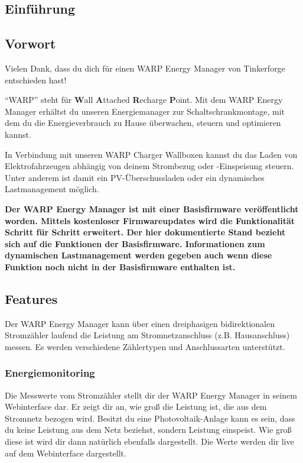 \documentclass[a4paper,10pt]{article}
\begin{document}
\begin{multicols*}{2}
	\tableofcontents
	\newpage
	\section{Einführung}
	\subsection{Vorwort} Vielen Dank, dass du
	dich für einen WARP Energy Manager von Tinkerforge entschieden hast!

	\enquote{WARP} steht
	für \textbf{W}all \textbf{A}ttached
	\textbf{R}echarge \textbf{P}oint. Mit dem WARP Energy Manager
	erhältst du unseren Energiemanager zur Schaltschrankmontage, mit dem du die
	Energieverbrauch zu Hause überwachen, steuern und optimieren kannst. 

	In Verbindung mit unseren WARP Charger Wallboxen kannst du das Laden von
	Elektrofahrzeugen abhängig von deinem Strombezug oder -Einspeisung steuern.
	Unter anderem ist damit ein PV-Überschussladen oder ein dynamisches
	Lastmanagement möglich.

	\textbf{Der WARP Energy Manager ist mit einer Basisfirmware veröffentlicht
	worden. Mittels kostenloser Firmwareupdates wird die Funktionalität Schritt
	für Schritt erweitert. Der hier dokumentierte Stand bezieht sich auf die
	Funktionen der Basisfirmware. Informationen zum dynamischen Lastmanagement
	werden gegeben auch wenn diese Funktion noch nicht in der Basisfirmware
	enthalten ist.}

	\subsection{Features}
	\vspace{-0.1cm}
	Der WARP Energy Manager kann über einen dreiphasigen bidirektionalen 
	Stromzähler laufend die Leistung am Stromnetzanschluss (z.B. Hausanschluss)
	messen. Es werden verschiedene Zählertypen und Anschlussarten unterstützt.

	\subsubsection{Energiemonitoring}
	Die Messwerte vom Stromzähler stellt dir der WARP Energy Manager in seinem
	Webinterface dar. Er zeigt dir an, wie groß die Leistung ist, die aus dem Stromnetz
	bezogen wird. Besitzt du eine Photovoltaik-Anlage kann es sein, dass du
	keine Leistung aus dem Netz beziehst, sondern Leistung einspeist. 
	Wie groß diese ist wird dir dann natürlich ebenfalls dargestellt. Die Werte
	werden dir live auf dem Webinterface dargestellt.


\end{multicols*}
\end{document}
